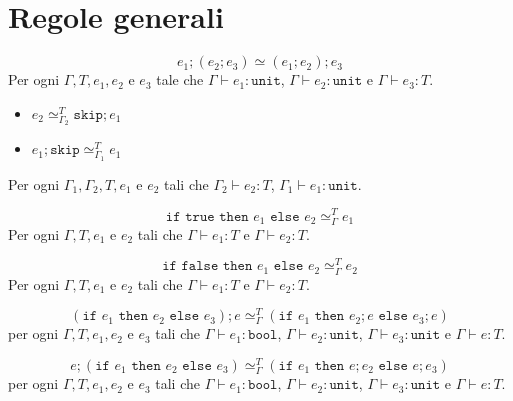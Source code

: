 \section{Regole generali}
\begin{tcolorbox}[title = Associatività del $;$]
    \[
        e_1; (e_2; e_3) \simeq (e_1; e_2); e_3    
    \]
    Per ogni $\Gamma, T, e_1, e_2$ e $e_3$ tale che $\Gamma \vdash e_1 : \texttt{unit}$,
    $\Gamma \vdash e_2 : \texttt{unit}$ e $\Gamma \vdash e_3 : T$.
\end{tcolorbox}
\begin{tcolorbox}[title = rimozione dello \texttt{skip}]
    \begin{itemize}
        \item $e_2 \simeq_{\Gamma_2}^{T} \texttt{skip}; e_1$
        \item $e_1; \texttt{skip} \simeq_{\Gamma_1}^{T} e_1$
    \end{itemize}
    Per ogni $\Gamma_1, \Gamma_2, T, e_1$ e $e_2$ tali che
    $\Gamma_2 \vdash e_2 : T$,
    $\Gamma_1 \vdash e_1 : \texttt{unit}$.
\end{tcolorbox}
\begin{tcolorbox}[title = \texttt{if true}]
    \[
      \texttt{if true then } e_1 \texttt{ else } e_2 \simeq_\Gamma^T e_1  
    \]
    Per ogni $\Gamma, T, e_1$ e $e_2$ tali che $\Gamma \vdash e_1 : T$ e
    $\Gamma \vdash e_2 : T$.
\end{tcolorbox}
\begin{tcolorbox}[title = \texttt{if false}]
    \[
      \texttt{if false then } e_1 \texttt{ else } e_2 \simeq_\Gamma^T e_2  
    \]
    Per ogni $\Gamma, T, e_1$ e $e_2$ tali che $\Gamma \vdash e_1 : T$ e
    $\Gamma \vdash e_2 : T$.
\end{tcolorbox}
\begin{tcolorbox}[title = Distributività dell'\texttt{if} rispetto all'$;$]
    \[
        (\texttt{if } e_1 \texttt{ then } e_2 \texttt{ else } e_3); e \simeq_\Gamma^T
        (\texttt{if } e_1 \texttt{ then } e_2; e \texttt{ else } e_3; e)
    \]
    per ogni $\Gamma, T, e_1, e_2$ e $e_3$ tali che $\Gamma \vdash e_1 : \texttt{bool}$,
    $\Gamma \vdash e_2 : \texttt{unit}$, $\Gamma \vdash e_3 : \texttt{unit}$ e
    $\Gamma \vdash e : T$.
\end{tcolorbox}
\begin{tcolorbox}[title = Distributività dell'$;$ rispetto all'\texttt{if}]
    \[
        e; (\texttt{if } e_1 \texttt{ then } e_2 \texttt{ else } e_3) \simeq_\Gamma^T
        (\texttt{if } e_1 \texttt{ then } e; e_2 \texttt{ else } e; e_3)
    \]
    per ogni $\Gamma, T, e_1, e_2$ e $e_3$ tali che $\Gamma \vdash e_1 : \texttt{bool}$,
    $\Gamma \vdash e_2 : \texttt{unit}$, $\Gamma \vdash e_3 : \texttt{unit}$ e
    $\Gamma \vdash e : T$.
\end{tcolorbox}

